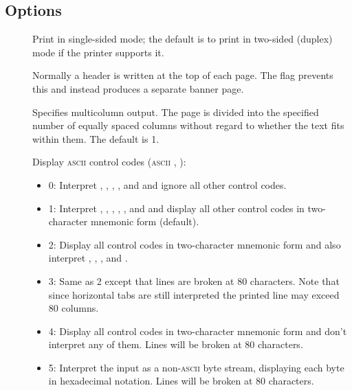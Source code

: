 \subsection*{Options}

\begin{description}
\item[]
   Print in single-sided mode; the default is to print in two-sided (duplex)
   mode if the printer supports it.

\item[]
   Normally a header is written at the top of each page.  The  flag
   prevents this and instead produces a separate banner page.

\item[\code{\#}]
   Specifies multicolumn output.  The page is divided into the specified
   number of equally spaced columns without regard to whether the text fits
   within them.  The default is 1.

\item[\code{\#}]
   Display \textsc{ascii} control codes (\textsc{ascii} ,
   ):

   \begin{itemize}
   \item
      0: Interpret , , , , and 
      and ignore all other control codes.

   \item
      1: Interpret , , , , , and
       and display all other control codes in two-character mnemonic
      form (default).

   \item
      2: Display all control codes in two-character mnemonic form and also
      interpret , , , and .

   \item
      3: Same as 2 except that lines are broken at 80 characters.  Note that
      since horizontal tabs are still interpreted the printed line may exceed
      80 columns.

   \item
      4: Display all control codes in two-character mnemonic form and don't
      interpret any of them.  Lines will be broken at 80 characters.

   \item
      5: Interpret the input as a non-\textsc{ascii} byte stream, displaying
      each byte in hexadecimal notation.  Lines will be broken at 80
      characters.
   \end{itemize}


\end{description}
